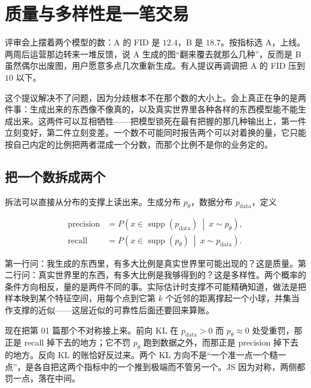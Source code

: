 \section{质量与多样性是一笔交易}
\label{sec:14-Deep-Learning/07-Generative-Models-Unified/04}

评审会上摆着两个模型的数：A 的 FID 是 \(12.4\)，B 是 \(18.7\)。按指标选 A，上线。两周后运营那边转来一堆反馈，说 A 生成的图``翻来覆去就那么几种''，反而是 B 虽然偶尔出废图，用户愿意多点几次重新生成。有人提议再调调把 A 的 FID 压到 \(10\) 以下。

这个提议解决不了问题，因为分歧根本不在那个数的大小上。会上真正在争的是两件事：生成出来的东西像不像真的，以及真实世界里各种各样的东西模型能不能生成出来。这两件可以互相牺牲——把模型锁死在最有把握的那几种输出上，第一件立刻变好，第二件立刻变差。一个数不可能同时报告两个可以对着换的量，它只能按自己内定的比例把两者混成一个分数，而那个比例不是你的业务定的。

\subsection{把一个数拆成两个}

拆法可以直接从分布的支撑上读出来。生成分布 \(p_\theta\)，数据分布 \(p_{\text{data}}\)，定义

\[
\begin{aligned}
\text{precision}&=P\!\left(x\in\operatorname{supp}(p_{\text{data}})\ \middle|\ x\sim p_\theta\right),\\
\text{recall}&=P\!\left(x\in\operatorname{supp}(p_\theta)\ \middle|\ x\sim p_{\text{data}}\right).
\end{aligned}
\]

第一行问：我生成的东西里，有多大比例是真实世界里可能出现的？这是质量。第二行问：真实世界里的东西，有多大比例是我够得到的？这是多样性。两个概率的条件方向相反，量的是两件不同的事。实际估计时支撑不可能精确知道，做法是把样本映到某个特征空间，用每个点到它第 \(k\) 个近邻的距离撑起一个小球，并集当作支撑的近似——这层近似的可靠性后面还要回来算账。

现在把第 01 篇那个不对称接上来。前向 KL 在 \(p_{\text{data}}>0\) 而 \(p_\theta\approx0\) 处受重罚，那正是 recall 掉下去的地方；它不罚 \(p_\theta\) 跑到数据之外，而那正是 precision 掉下去的地方。反向 KL 的账恰好反过来。两个 KL 方向不是``一个准一点一个糙一点''，是各自把这两个指标中的一个推到极端而不管另一个。JS 因为对称，两侧都罚一点，落在中间。

